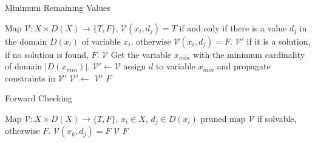 \documentclass[10pt,aspectratio=43,mathserif]{beamer}
\begin{document}
    \begin{frame}[allowframebreaks]{Minimum Remaining Values}
        \begin{algorithmic}[1]
                    \Require Map $\mathcal V:X\times D(X) \to \{T,F\}$, $\mathcal V(x_i,d_j)=T$ if and only if there is a value $d_j$ in the domain $D(x_i)$ of variable $x_i$, otherwise $\mathcal V(x_i,d_j)=F$. 
                    \Ensure $\mathcal V'$ if it is a solution, if no solution is found, $F$.
                            \State \Return $\mathcal V$
                        \EndIf
                        \State Get the variable $x_{min}$ with the minimum cardinality of domain $|D(x_{min})|$.
                            \State $\mathcal V' \gets \mathcal V$ 
                            \State assign $d$ to variable $x_{min}$ and propagate constraints in $\mathcal V'$
                                \State $\mathcal V'\gets$ 
                                    \State \Return $\mathcal V'$
                                \EndIf
                            \EndIf
                        \EndFor
                        \State \Return $F$
                    \EndFunction
                \end{algorithmic}
        \end{frame}

        \begin{frame}{Forward Checking}
            \begin{algorithmic}[1]
                    \Require Map $\mathcal V:X\times D(X) \to \{T,F\}$, $x_i\in X$, $d_j\in D(x_i)$
                    \Ensure pruned map $\mathcal V$ if solvable, otherwise $F$.
                            \State $\mathcal V(x_k,d_j)=F$ 
                        \EndFor
                            \State \Return $\mathcal V$
                        \Else
                            \State \Return $F$
                        \EndIf
                    \EndFunction
                \end{algorithmic}
        \end{frame}
\end{document}
